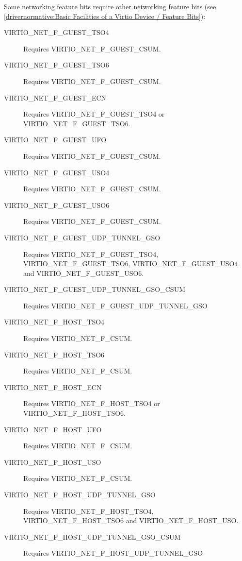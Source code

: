 Some networking feature bits require other networking feature bits
(see \ref{drivernormative:Basic Facilities of a Virtio Device / Feature Bits}):

\begin{description}
\item[VIRTIO_NET_F_GUEST_TSO4] Requires VIRTIO_NET_F_GUEST_CSUM.
\item[VIRTIO_NET_F_GUEST_TSO6] Requires VIRTIO_NET_F_GUEST_CSUM.
\item[VIRTIO_NET_F_GUEST_ECN] Requires VIRTIO_NET_F_GUEST_TSO4 or VIRTIO_NET_F_GUEST_TSO6.
\item[VIRTIO_NET_F_GUEST_UFO] Requires VIRTIO_NET_F_GUEST_CSUM.
\item[VIRTIO_NET_F_GUEST_USO4] Requires VIRTIO_NET_F_GUEST_CSUM.
\item[VIRTIO_NET_F_GUEST_USO6] Requires VIRTIO_NET_F_GUEST_CSUM.
\item[VIRTIO_NET_F_GUEST_UDP_TUNNEL_GSO] Requires VIRTIO_NET_F_GUEST_TSO4, VIRTIO_NET_F_GUEST_TSO6,
   VIRTIO_NET_F_GUEST_USO4 and VIRTIO_NET_F_GUEST_USO6.
\item[VIRTIO_NET_F_GUEST_UDP_TUNNEL_GSO_CSUM] Requires VIRTIO_NET_F_GUEST_UDP_TUNNEL_GSO

\item[VIRTIO_NET_F_HOST_TSO4] Requires VIRTIO_NET_F_CSUM.
\item[VIRTIO_NET_F_HOST_TSO6] Requires VIRTIO_NET_F_CSUM.
\item[VIRTIO_NET_F_HOST_ECN] Requires VIRTIO_NET_F_HOST_TSO4 or VIRTIO_NET_F_HOST_TSO6.
\item[VIRTIO_NET_F_HOST_UFO] Requires VIRTIO_NET_F_CSUM.
\item[VIRTIO_NET_F_HOST_USO] Requires VIRTIO_NET_F_CSUM.
\item[VIRTIO_NET_F_HOST_UDP_TUNNEL_GSO] Requires VIRTIO_NET_F_HOST_TSO4, VIRTIO_NET_F_HOST_TSO6
   and VIRTIO_NET_F_HOST_USO.
\item[VIRTIO_NET_F_HOST_UDP_TUNNEL_GSO_CSUM] Requires VIRTIO_NET_F_HOST_UDP_TUNNEL_GSO


\end{description}
